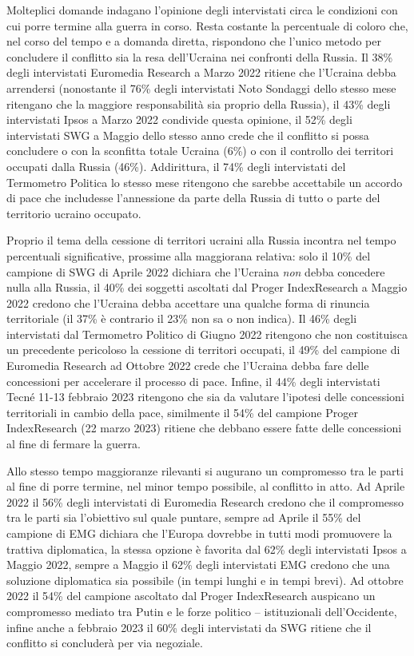 \documentclass[
  openany]{book}
\begin{document}
Molteplici domande indagano l'opinione degli intervistati circa le condizioni con cui porre termine alla guerra in corso. Resta costante la percentuale di coloro che, nel corso del tempo e a domanda diretta, rispondono che l'unico metodo per concludere il conflitto sia la resa dell'Ucraina nei confronti della Russia. Il 38\% degli intervistati Euromedia Research a Marzo 2022 ritiene che l'Ucraina debba arrendersi (nonostante il 76\% degli intervistati Noto Sondaggi dello stesso mese ritengano che la maggiore responsabilità sia proprio della Russia), il 43\% degli intervistati Ipsos a Marzo 2022 condivide questa opinione, il 52\% degli intervistati SWG a Maggio dello stesso anno crede che il conflitto si possa concludere o con la sconfitta totale Ucraina (6\%) o con il controllo dei territori occupati dalla Russia (46\%). Addirittura, il 74\% degli intervistati del Termometro Politica lo stesso mese ritengono che sarebbe accettabile un accordo di pace che includesse l'annessione da parte della Russia di tutto o parte del territorio ucraino occupato.

Proprio il tema della cessione di territori ucraini alla Russia incontra nel tempo percentuali significative, prossime alla maggiorana relativa: solo il 10\% del campione di SWG di Aprile 2022 dichiara che l'Ucraina \emph{non} debba concedere nulla alla Russia, il 40\% dei soggetti ascoltati dal Proger IndexResearch a Maggio 2022 credono che l'Ucraina debba accettare una qualche forma di rinuncia territoriale (il 37\% è contrario il 23\% non sa o non indica). Il 46\% degli intervistati dal Termometro Politico di Giugno 2022 ritengono che non costituisca un precedente pericoloso la cessione di territori occupati, il 49\% del campione di Euromedia Research ad Ottobre 2022 crede che l'Ucraina debba fare delle concessioni per accelerare il processo di pace. Infine, il 44\% degli intervistati Tecné 11-13 febbraio 2023 ritengono che sia da valutare l'ipotesi delle concessioni territoriali in cambio della pace, similmente il 54\% del campione Proger IndexResearch (22 marzo 2023) ritiene che debbano essere fatte delle concessioni al fine di fermare la guerra.

Allo stesso tempo maggioranze rilevanti si augurano un compromesso tra le parti al fine di porre termine, nel minor tempo possibile, al conflitto in atto. Ad Aprile 2022 il 56\% degli intervistati di Euromedia Research credono che il compromesso tra le parti sia l'obiettivo sul quale puntare, sempre ad Aprile il 55\% del campione di EMG dichiara che l'Europa dovrebbe in tutti modi promuovere la trattiva diplomatica, la stessa opzione è favorita dal 62\% degli intervistati Ipsos a Maggio 2022, sempre a Maggio il 62\% degli intervistati EMG credono che una soluzione diplomatica sia possibile (in tempi lunghi e in tempi brevi). Ad ottobre 2022 il 54\% del campione ascoltato dal Proger IndexResearch auspicano un compromesso mediato tra Putin e le forze politico -- istituzionali dell'Occidente, infine anche a febbraio 2023 il 60\% degli intervistati da SWG ritiene che il conflitto si concluderà per via negoziale.
\end{document}
